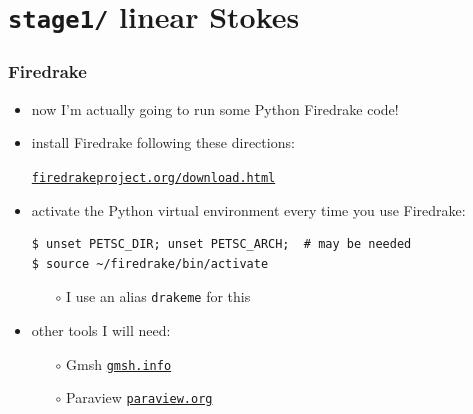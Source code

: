 \documentclass[10pt,hyperref,dvipsnames]{beamer}
\begin{document}
\section{\texttt{stage1/} \qquad linear Stokes}

\begin{frame}[fragile]
\frametitle{Firedrake}

\begin{itemize}
\item now I'm actually going to run some Python Firedrake code!
\item install Firedrake following these directions:

\begin{center}
\href{https://www.firedrakeproject.org/download.html}{\texttt{firedrakeproject.org/download.html}}
\end{center}
\item activate the Python virtual environment every time you use Firedrake:

\bigskip
\begin{Verbatim}
$ unset PETSC_DIR; unset PETSC_ARCH;  # may be needed
$ source ~/firedrake/bin/activate
\end{Verbatim}

\bigskip
    \begin{itemize}
    \item[$\circ$] I use an alias \texttt{drakeme} for this
    \end{itemize}
\item other tools I will need:
    \begin{itemize}
    \item[$\circ$] Gmsh \quad \href{https://gmsh.info/}{\texttt{gmsh.info}}
    \item[$\circ$] Paraview \quad \href{https://www.paraview.org/}{\texttt{paraview.org}}
    \end{itemize}
\end{itemize}
\end{frame}
\end{document}
